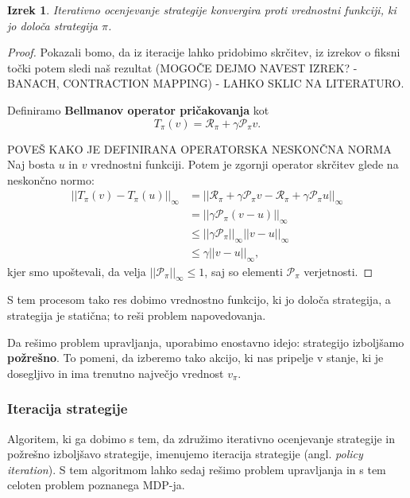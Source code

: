 \documentclass[12pt,a4paper]{amsart}
\theoremstyle{definition} %
\theoremstyle{plain} %
\newtheorem{izrek}[definicija]{Izrek}
\begin{document}
\begin{izrek}
    Iterativno ocenjevanje strategije konvergira proti vrednostni funkciji, ki jo določa strategija 
    $\pi$.
\end{izrek}

\begin{proof}
    Pokazali bomo, da iz iteracije lahko pridobimo skrčitev, iz izrekov o fiksni točki potem sledi 
    naš rezultat (MOGOČE DEJMO NAVEST IZREK? - BANACH, CONTRACTION MAPPING) - LAHKO SKLIC NA 
    LITERATURO.

    Definiramo \textbf{Bellmanov operator pričakovanja} kot 
    $$
    T_\pi(v) = \mathcal{R}_\pi + \gamma \mathcal{P}_\pi v.
    $$

    POVEŠ KAKO JE DEFINIRANA OPERATORSKA NESKONČNA NORMA
    Naj bosta $u$ in $v$ vrednostni funkciji. Potem je zgornji operator skrčitev glede na neskončno 
    normo: 
    \begin{align*}
        ||T_\pi(v) - T_\pi(u)||_\infty &= ||\mathcal{R}_\pi + \gamma \mathcal{P}_\pi v - 
                                            \mathcal{R}_\pi + \gamma \mathcal{P}_\pi u||_\infty \\  
        &= ||\gamma \mathcal{P}_\pi (v - u)||_\infty \\
        &\leq ||\gamma \mathcal{P}_\pi||_\infty ||v - u||_\infty \\
        &\leq \gamma ||v - u||_\infty,
    \end{align*}
    kjer smo upoštevali, da velja $||\mathcal{P}_\pi||_\infty \leq 1$, saj so elementi 
    $\mathcal{P}_\pi$ verjetnosti.

\end{proof}

S tem procesom tako res dobimo vrednostno funkcijo, ki jo določa strategija, a strategija je 
statična; to reši problem napovedovanja. 

Da rešimo problem upravljanja, uporabimo enostavno idejo: strategijo izboljšamo \textbf{požrešno}. 
To pomeni, da izberemo tako akcijo, ki nas pripelje v stanje, ki je dosegljivo in ima trenutno 
največjo vrednost $v_\pi$.

\subsubsection{Iteracija strategije}
Algoritem, ki ga dobimo s tem, da združimo iterativno ocenjevanje strategije in požrešno izboljšavo 
strategije, imenujemo iteracija strategije (angl. \textit{policy iteration}). S tem algoritmom 
lahko sedaj rešimo problem upravljanja in s tem celoten problem poznanega MDP-ja. 
\end{document}
